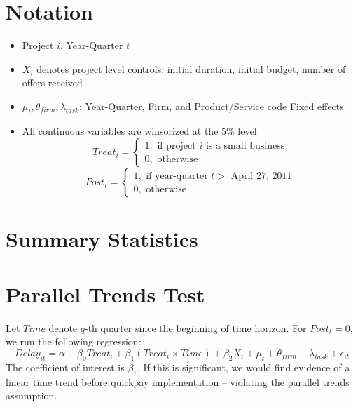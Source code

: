 \documentclass[
]{article}
\providecommand{\tightlist}{%
  \setlength{\itemsep}{0pt}\setlength{\parskip}{0pt}}
\begin{document}
\hypertarget{notation}{%
\section{Notation}\label{notation}}

\begin{itemize}
\tightlist
\item
  Project \(i\), Year-Quarter \(t\)
\item
  \(X_i\) denotes project level controls: initial duration, initial
  budget, number of offers received
\item
  \(\mu_t,\theta_{firm},\lambda_{task}\): Year-Quarter, Firm, and
  Product/Service code Fixed effects
\item
  All continuous variables are winsorized at the 5\% level
  \[ Treat_i = \begin{cases} 1, \text{ if project } i \text{ is a small business}\\
  0, \text{ otherwise} \end{cases}\]
  \[ Post_t = \begin{cases} 1, \text{ if year-quarter } t > \text{ April 27, 2011}\\
  0, \text{ otherwise} \end{cases}\]
\end{itemize}

\hypertarget{summary-statistics}{%
\section{Summary Statistics}\label{summary-statistics}}

\hypertarget{parallel-trends-test}{%
\section{Parallel Trends Test}\label{parallel-trends-test}}

Let \(Time\) denote \(q\)-th quarter since the beginning of time
horizon. For \(Post_t =0\), we run the following regression:
\[ Delay_{it} = \alpha+\beta_0 Treat_i + \beta_1 (Treat_i \times Time) + \beta_2 X_i + \mu_t + \theta_{firm} + \lambda_{task} +\epsilon_{it}\]
The coefficient of interest is \(\beta_1\). If this is significant, we
would find evidence of a linear time trend before quickpay
implementation -- violating the parallel trends assumption.
\end{document}
